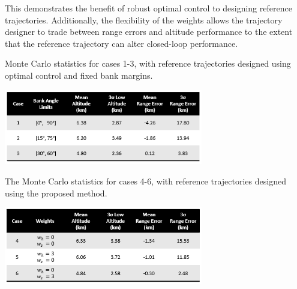 This demonstrates the benefit of robust optimal control to designing reference trajectories. Additionally, the flexibility of the weights allows the trajectory designer to trade between range errors and altitude performance to the extent that the reference trajectory can alter closed-loop performance. 
\begin{table}[h!]
	\centering
	\caption{Monte Carlo statistics for cases 1-3, with reference trajectories designed using optimal control and fixed bank margins.}
	\includegraphics[width=0.65\textwidth]{../PropellantOptimalJournal/ddp/table_deterministic}
	\label{table_deterministic}
\end{table}
\begin{table}[h!]
	\centering
	\caption{The Monte Carlo statistics for cases 4-6, with reference trajectories designed using the proposed method.}
	\includegraphics[width=0.65\textwidth]{../PropellantOptimalJournal/ddp/table_robust} %
	\label{table_robust}
\end{table}


